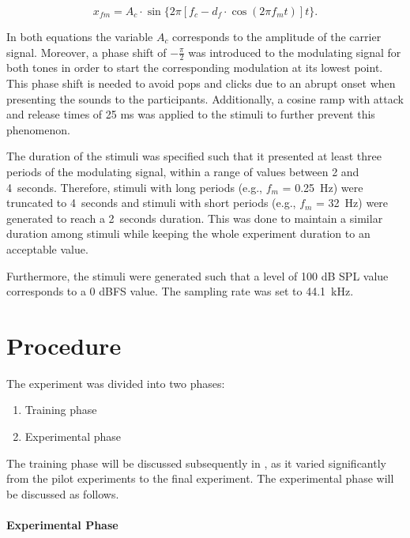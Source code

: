 \documentclass[../main.tex]{subfiles}
\begin{document}
\begin{equation}
  x_{fm} = A_c \cdot \sin \{2 \pi [f_c - d_f \cdot \cos(2 \pi f_m t)] t \}.
  \label{eq:fm}
\end{equation}

In both equations the variable $A_c$ corresponds to the amplitude of the
carrier signal. Moreover, a phase shift of $-\frac{\pi}{2}$ was introduced to
the modulating signal for both tones in order to start the corresponding
modulation at its lowest point. This phase shift is needed to avoid pops and
clicks due to an abrupt onset when presenting the sounds to the participants.
Additionally, a cosine ramp with attack and release times of 25 ms was applied
to the stimuli to further prevent this phenomenon.

The duration of the stimuli was specified such that it presented at least three
periods of the modulating signal, within a range of values between 2 and
4~seconds. Therefore, stimuli with long periods (e.g., $f_m$ = 0.25~Hz) were
truncated to 4~seconds and stimuli with short periods (e.g., $f_m$ = 32~Hz) were
generated to reach a 2~seconds duration. This was done to maintain a similar
duration among stimuli while keeping the whole experiment duration to an
acceptable value.

Furthermore, the stimuli were generated such that a level of 100 dB SPL value
corresponds to a 0 dBFS value. The sampling rate was set to 44.1~kHz.

\section{Procedure}
\label{sec:procedure}

The experiment was divided into two phases:
\begin{enumerate}
  \item Training phase
  \item Experimental phase
\end{enumerate}

The training phase will be discussed subsequently in
, as it varied significantly from the pilot
experiments to the final experiment. The experimental phase will be discussed
as follows.

\paragraph{Experimental Phase}

\end{document}
